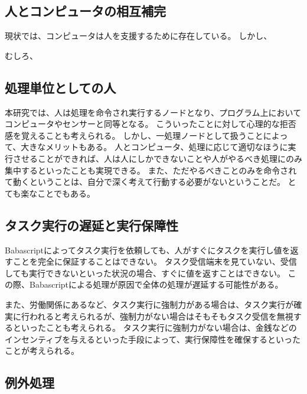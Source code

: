 \subsection{人とコンピュータの相互補完}\label{ux4ebaux3068ux30b3ux30f3ux30d4ux30e5ux30fcux30bfux306eux76f8ux4e92ux88dcux5b8c}

現状では、コンピュータは人を支援するために存在している。 しかし、

むしろ、

\subsection{処理単位としての人}\label{ux51e6ux7406ux5358ux4f4dux3068ux3057ux3066ux306eux4eba}

本研究では、人は処理を命令され実行するノードとなり、プログラム上においてコンピュータやセンサーと同等となる。
こういったことに対して心理的な拒否感を覚えることも考えられる。
しかし、一処理ノードとして扱うことによって、大きなメリットもある。
人とコンピュータ、処理に応じて適切なほうに実行させることができれば、人は人にしかできないことや人がやるべき処理にのみ集中するといったことも実現できる。
また、ただやるべきことのみを命令されて動くということは、自分で深く考えて行動する必要がないということだ。
とても楽なことでもある。

\subsection{タスク実行の遅延と実行保障性}\label{ux30bfux30b9ux30afux5b9fux884cux306eux9045ux5ef6ux3068ux5b9fux884cux4fddux969cux6027}

Babascriptによってタスク実行を依頼しても、人がすぐにタスクを実行し値を返すことを完全に保証することはできない。
タスク受信端末を見ていない、受信しても実行できないといった状況の場合、すぐに値を返すことはできない。
この際、Babascriptによる処理が原因で全体の処理が遅延する可能性がある。

また、労働関係にあるなど、タスク実行に強制力がある場合は、タスク実行が確実に行われると考えられるが、強制力がない場合はそもそもタスク受信を無視するといったことも考えられる。
タスク実行に強制力がない場合は、金銭などのインセンティブを与えるといった手段によって、実行保障性を確保するといったことが考えられる。

\subsection{例外処理}\label{ux4f8bux5916ux51e6ux7406}

